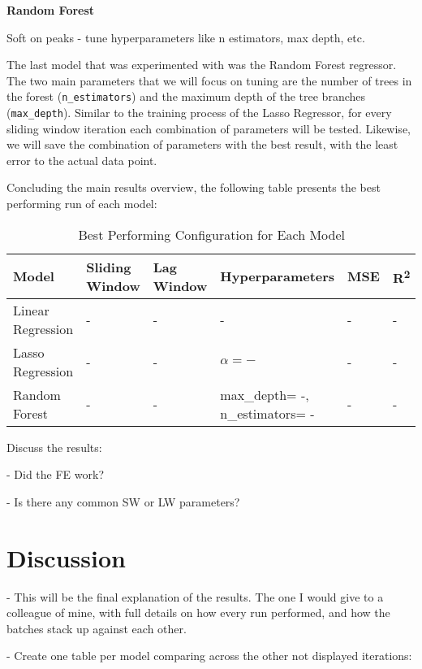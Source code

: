 \documentclass[12pt]{report} %
\begin{document}

\noindent \textbf{Random Forest}

Soft on peaks - tune hyperparameters like n estimators, max depth, etc.

The last model that was experimented with was the Random Forest regressor. The two main parameters that we will focus on tuning are the number of trees in the forest (\small{\verb|n_estimators|}) and the maximum depth of the tree branches (\small{\verb|max_depth|}). Similar to the training process of the Lasso Regressor, for every sliding window iteration each combination of parameters will be tested. Likewise, we will save the combination of parameters with the best result, with the least error to the actual data point.

Concluding the main results overview, the following table presents the best performing run of each model:
\begin{table}[H]
	\caption{Best Performing Configuration for Each Model}
	\centering
	\begin{tabular}{|P{2.5cm}|P{1.8cm}|P{1.8cm}|P{3.2cm}|P{1.5cm}|P{1.5cm}|}
		\hline
		\textbf{Model} & \textbf{Sliding Window} & \textbf{Lag Window} & \textbf{Hyperparameters} & \textbf{MSE} & \textbf{R\textsuperscript{2}} \\
		\hline
		Linear Regression & - & - & - & - & - \\
		\hline
		Lasso Regression & - & - & $\alpha = -$ & - & - \\
		\hline
		Random Forest & - & - & max\_depth= -, n\_estimators= - & - & - \\
		\hline
	\end{tabular}
\end{table}

Discuss the results:

- Did the FE work?

- Is there any common SW or LW parameters?


\section{Discussion} %
- This will be the final explanation of the results. The one I would give to a colleague of mine, with full details on how every run performed, and how the batches stack up against each other.

- Create one table per model comparing across the other not displayed iterations:
\end{document}
